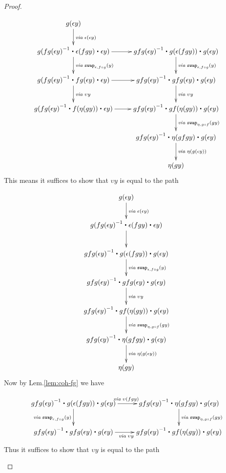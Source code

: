 \begin{proof}
\begin{description}
\begin{enumerate}
\begin{align*}
\xymatrix{
g(\epsilon y) \ar[d]^{\mathit{via \;} \epsilon(\epsilon y)} & \\
g(\opp{fg(\epsilon y)} \ct \epsilon (f g y) \ct \epsilon y) \ar[d]^{\mathit{via \; } \com{\epsilon}{f \circ g}{y}} \ar[r] &
\opp{gfg(\epsilon y)} \ct g(\epsilon (f g y)) \ct g(\epsilon y) \ar[d]^{\mathit{via \; } \com{\epsilon}{f \circ g}{y}} \\  
g(\opp{fg(\epsilon y)} \ct fg (\epsilon y) \ct \epsilon y) \ar[d]^{\mathit{via \;} \upsilon y} \ar[r] &
\opp{gfg(\epsilon y)} \ct gfg (\epsilon y) \ct g(\epsilon y) \ar[d]^{\mathit{via \;} \upsilon y} \\
g(\opp{fg(\epsilon y)} \ct f (\eta(g y)) \ct \epsilon y) \ar[r] &
\opp{gfg(\epsilon y)} \ct gf(\eta (g y)) \ct g(\epsilon y) \ar[d]^{\mathit{via\;}\com{\eta}{g\circ f}{gy}} \\
 & \opp{gfg(\epsilon y)} \ct \eta (gfgy) \ct g(\epsilon y) \ar[d]^{\mathit{via \;} \eta(g(\epsilon y))} \\
 & \eta(g y)}
\end{align*}
This means it suffices to show that $\upsilon y$ is equal to the path

\begin{align*}
\xymatrix{
g(\epsilon y) \ar[d]^{\mathit{via \;} \epsilon(\epsilon y)} \\
g(\opp{fg(\epsilon y)} \ct \epsilon (f g y) \ct \epsilon y) \ar[d] \\
\opp{gfg(\epsilon y)} \ct g(\epsilon (f g y)) \ct g(\epsilon y) \ar[d]^{\mathit{via \; } \com{\epsilon}{f \circ g}{y}} \\
\opp{gfg(\epsilon y)} \ct gfg (\epsilon y) \ct g(\epsilon y) \ar[d]^{\mathit{via \;} \upsilon y} \\
\opp{gfg(\epsilon y)} \ct gf(\eta (g y)) \ct g(\epsilon y) \ar[d]^{\mathit{via\;}\com{\eta}{g\circ f}{gy}} \\
\opp{gfg(\epsilon y)} \ct \eta (gfgy) \ct g(\epsilon y) \ar[d]^{\mathit{via \;} \eta(g(\epsilon y))} \\
\eta(g y)}
\end{align*}
Now by Lem.\ref{lem:coh-fg} we have

\begin{align*}
\xymatrix{
\opp{gfg(\epsilon y)} \ct g(\epsilon (f g y)) \ct g(\epsilon y) \ar[d]_{\mathit{via \; } \com{\epsilon}{f \circ g}{y}} \ar[r]^{\mathit{via \; } \upsilon(fgy)} &
\opp{gfg(\epsilon y)} \ct \eta (gfgy) \ct g(\epsilon y) \ar[d]^{\mathit{via\;}\com{\eta}{g\circ f}{gy}} \\
\opp{gfg(\epsilon y)} \ct gfg (\epsilon y) \ct g(\epsilon y) \ar[r]_{\mathit{via \;} \upsilon y} &
\opp{gfg(\epsilon y)} \ct gf(\eta (g y)) \ct g(\epsilon y)} 
\end{align*}
Thus it suffices to show that $\upsilon y$ is equal to the path


\end{enumerate}
\end{description}
\end{proof}
